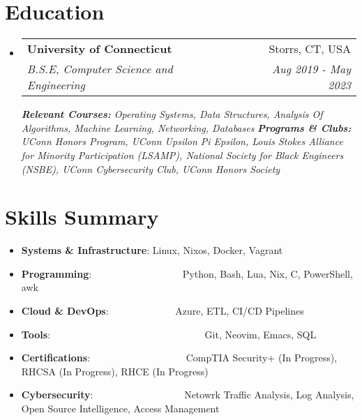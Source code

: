\documentclass[a4paper,11pt]{article}
\makeatletter
\newcommand{\resumeItem}[2]{
  \item\small{
    \textbf{#1}{: #2 \vspace{-2pt}}
  }
}
\newcommand{\resumeSubheading}[4]{
  \vspace{-1pt}\item
    \begin{tabular*}{0.97\textwidth}{l@{\extracolsep{\fill}}r}
      \textbf{#1} & #2 \\
      \textit{#3} & \textit{#4} \\
    \end{tabular*}\vspace{-5pt}
}
\newcommand{\resumeSubItem}[2]{\resumeItem{#1}{#2}\vspace{-3pt}}
\newcommand{\resumeSubHeadingListStart}{\begin{itemize}[leftmargin=*]}
\newcommand{\resumeSubHeadingListEnd}{\end{itemize}}
\makeatother
\begin{document}
\section{Education}

\vspace{5pt}
  \begin{itemize}[leftmargin=0pt, label={}]  %
    \resumeSubheading
      {University of Connecticut}{Storrs, CT, USA}
      {B.S.E, Computer Science and Engineering}{Aug 2019 - May 2023}
      \vspace{5pt}
      {\scriptsize \textit{ \footnotesize{\newline{}\textbf{Relevant Courses:} Operating Systems, Data Structures, Analysis Of Algorithms, Machine Learning, Networking, Databases}}}
      {\scriptsize \textit{ \footnotesize{\newline{}\textbf{Programs \& Clubs:}
  UConn Honors Program, UConn Upsilon Pi Epsilon, Louis Stokes Alliance for Minority Participation (LSAMP), National Society for Black Engineers (NSBE), UConn Cybersecurity Club, UConn Honors Society}}}
  \end{itemize}
  
\section{Skills Summary}
\vspace{1pt}
	\resumeSubHeadingListStart
	\resumeSubItem{Systems \& Infrastructure}{Linux, Nixos, Docker, Vagrant}
	\resumeSubItem{Programming}{~~~~~~~~~~~~~~~~~~Python, Bash, Lua, Nix, C, PowerShell, awk}
	\resumeSubItem{Cloud \& DevOps}{~~~~~~~~~~~~~Azure, ETL, CI/CD Pipelines}
	\resumeSubItem{Tools}{~~~~~~~~~~~~~~~~~~~~~~~~~~~~~~~Git, Neovim, Emacs, SQL}
	\resumeSubItem{Certifications}{~~~~~~~~~~~~~~~~~~~CompTIA Security+ (In Progress), RHCSA (In Progress), RHCE (In Progress)}
        \resumeSubItem{Cybersecurity}{~~~~~~~~~~~~~~~~~~Netowrk Traffic Analysis, Log Analysis, Open Source Intelligence, Access Management}
\resumeSubHeadingListEnd
\end{document}
